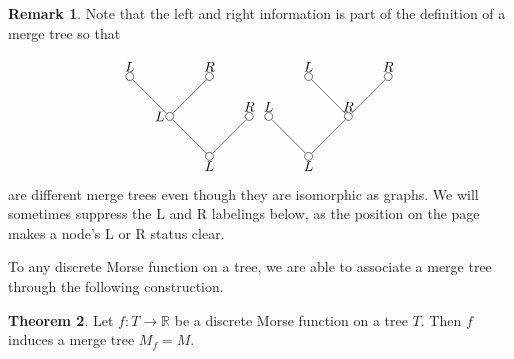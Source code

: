 \documentclass{article}
\theoremstyle{definition}
\newcommand{\RR}    {\mathbb{R}}
\newtheorem{thm}{Theorem}%
\newtheorem{rem}[thm]   {Remark}
\begin{document}
\begin{rem}
Note that the left and right information is part of the definition of a merge tree so that

$$
\begin{tikzpicture}

\node[inner sep=2pt, circle] (0) at (0,0) [draw] {};
\node[inner sep=2pt, circle] (1) at (-1,1) [draw] {};
\node[inner sep=2pt, circle] (2) at (1,1) [draw] {};
\node[inner sep=2pt, circle] (3) at (-2,2) [draw] {};
\node[inner sep=2pt, circle] (4) at (0,2) [draw] {};


\draw[-]  (0)--(1) node[midway, below] {};
\draw[-]  (0)--(2) node[midway, below] {};
\draw[-]  (1)--(4) node[midway, below] {};
\draw[-]  (1)--(3) node[midway, below] {};



\node[anchor = north]  at (0) {{$L$}};
\node[anchor = east]  at (1) {{$L$}};
\node[anchor = south]  at (2) {{$R$}};
\node[anchor = south]  at (3) {{$L$}};
\node[anchor = south]  at (4) {{$R$}};

\end{tikzpicture}
\begin{tikzpicture}

\node[inner sep=2pt, circle] (0) at (0,0) [draw] {};
\node[inner sep=2pt, circle] (1) at (-1,1) [draw] {};
\node[inner sep=2pt, circle] (2) at (1,1) [draw] {};
\node[inner sep=2pt, circle] (3) at (0,2) [draw] {};
\node[inner sep=2pt, circle] (4) at (2,2) [draw] {};



\draw[-]  (0)--(1) node[midway, below] {};
\draw[-]  (0)--(2) node[midway, below] {};
\draw[-]  (2)--(4) node[midway, below] {};
\draw[-]  (2)--(3) node[midway, below] {};


\node[anchor = north]  at (0) {{$L$}};
\node[anchor = south]  at (1) {{$L$}};
\node[anchor = south]  at (2) {{$R$}};
\node[anchor = south]  at (3) {{$L$}};
\node[anchor = south]  at (4) {{$R$}};

\end{tikzpicture}
$$
are different merge trees even though they are isomorphic as graphs. We will sometimes suppress the L and R labelings below, as the position on the page makes a node's L or R status clear.

\end{rem}


To any discrete Morse function on a tree, we are able to associate a merge tree through the following construction.

\begin{thm}\label{thm: construct mereg tree} Let $f\colon T \to \RR$ be a discrete Morse function on a tree $T$. Then $f$ induces a merge tree $M_f=M$.
\end{thm}
\end{document}
